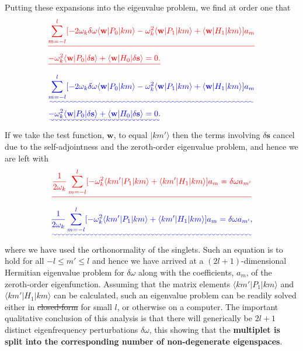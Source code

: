 \documentclass[a4paper,12pt]{paper}
\providecommand{\DIFadd}[1]{{\protect\color{blue}\uwave{#1}}} %
\providecommand{\DIFdel}[1]{{\protect\color{red}\sout{#1}}}                      %
\providecommand{\DIFaddbegin}{} %
\providecommand{\DIFaddend}{} %
\providecommand{\DIFdelbegin}{} %
\providecommand{\DIFdelend}{} %
\begin{document}
 Putting these expansions into the eigenvalue problem, we find at order one that
\DIFdelbegin \begin{eqnarray*}
&\DIFdel{\sum_{m=-l}^{l}[-2\omega_{k}\delta\omega\langle \mathbf{w}|P_{0}|km\rangle-\omega_{k}^{2}\langle 
    \mathbf{w}|P_{1}|km\rangle+\langle \mathbf{w}|H_{1}|km\rangle]a_{m} \nonumber}\\ &\DIFdel{-\omega_{k}^{2}\langle 
        \mathbf{w}|P_{0}|\delta\mathbf{s}\rangle+\langle \mathbf{w}|H_{0}|\delta\mathbf{s}\rangle=0.
}\end{eqnarray*}%
\DIFdelend \DIFaddbegin \begin{align}
&\DIFadd{\sum_{m=-l}^{l}[-2\omega_{k}\delta\omega\langle \mathbf{w}|P_{0}|km\rangle-\omega_{k}^{2}\langle 
    \mathbf{w}|P_{1}|km\rangle+\langle \mathbf{w}|H_{1}|km\rangle]a_{m} \nonumber}\\ &\DIFadd{-\omega_{k}^{2}\langle 
        \mathbf{w}|P_{0}|\delta\mathbf{s}\rangle+\langle \mathbf{w}|H_{0}|\delta\mathbf{s}\rangle=0.\label{eq:25}
}\end{align}\DIFaddend 
If we take the test function, $\mathbf{w}$, to equal $|km'\rangle$ then the terms involving $\delta\mathbf{s}$ cancel due to the self-adjointness 
 and the zeroth-order eigenvalue problem, and hence we are left with
\DIFdelbegin \begin{displaymath}
\DIFdel{\frac{1}{2\omega_{k}}\sum_{m=-l}^{l}[-\omega_{k}^{2}\langle km'|P_{1}|km\rangle+\langle km'|H_{1}|km\rangle]a_{m}=\delta\omega a_{m'}
}\end{displaymath}%
\DIFdelend \DIFaddbegin \begin{equation}\DIFadd{\label{eq:26}
\frac{1}{2\omega_{k}}\sum_{m=-l}^{l}[-\omega_{k}^{2}\langle km'|P_{1}|km\rangle+\langle km'|H_{1}|km\rangle]a_{m}=\delta\omega a_{m'},
}\end{equation}\DIFaddend 
where we have used the orthonormality of the singlets. Such an equation is to hold for all $-l\le m'\le l$ and hence we have 
arrived at a $(2l+1)$-dimensional Hermitian eigenvalue problem for $\delta\omega$ along with the coefficients, $a_{m}$, of the 
zeroth-order eigenfunction. Assuming that the matrix elements $\langle km'|P_{1}|km\rangle$ and $\langle km'|H_{1}|km\rangle$ can 
be calculated, such an eigenvalue problem can be readily solved either in \DIFdelbegin \DIFdel{closed-form }\DIFdelend \DIFaddbegin \DIFadd{closed form }\DIFaddend for small $l$, or otherwise on a computer. 
The important qualitative conclusion of this analysis is that there will generically be $2l+1$ distinct eigenfrequency perturbations 
$\delta\omega$, this showing that the \textbf{multiplet is split into the corresponding number of non-degenerate eigenspaces}.
\end{document}

